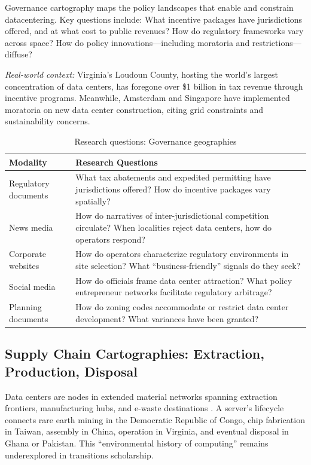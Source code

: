 \documentclass[review]{elsarticle}
\begin{document}
Governance cartography maps the policy landscapes that enable and constrain datacentering. Key questions include: What incentive packages have jurisdictions offered, and at what cost to public revenues? How do regulatory frameworks vary across space? How do policy innovations---including moratoria and restrictions---diffuse?

\textit{Real-world context:} Virginia's Loudoun County, hosting the world's largest concentration of data centers, has foregone over \$1 billion in tax revenue through incentive programs. Meanwhile, Amsterdam and Singapore have implemented moratoria on new data center construction, citing grid constraints and sustainability concerns.

\begin{table}[h]
\caption{Research questions: Governance geographies}
\label{tab:governance}
\begin{tabular}{p{3cm}p{9cm}}
\toprule
\textbf{Modality} & \textbf{Research Questions} \\
\midrule
Regulatory documents & What tax abatements and expedited permitting have jurisdictions offered? How do incentive packages vary spatially? \\
\addlinespace
News media & How do narratives of inter-jurisdictional competition circulate? When localities reject data centers, how do operators respond? \\
\addlinespace
Corporate websites & How do operators characterize regulatory environments in site selection? What ``business-friendly'' signals do they seek? \\
\addlinespace
Social media & How do officials frame data center attraction? What policy entrepreneur networks facilitate regulatory arbitrage? \\
\addlinespace
Planning documents & How do zoning codes accommodate or restrict data center development? What variances have been granted? \\
\bottomrule
\end{tabular}
\end{table}

\subsection{Supply Chain Cartographies: Extraction, Production, Disposal}

Data centers are nodes in extended material networks spanning extraction frontiers, manufacturing hubs, and e-waste destinations \citep{Gabrys2011, Starosielski2015}. A server's lifecycle connects rare earth mining in the Democratic Republic of Congo, chip fabrication in Taiwan, assembly in China, operation in Virginia, and eventual disposal in Ghana or Pakistan. This ``environmental history of computing'' \citep{Ensmenger2018} remains underexplored in transitions scholarship.
\end{document}

